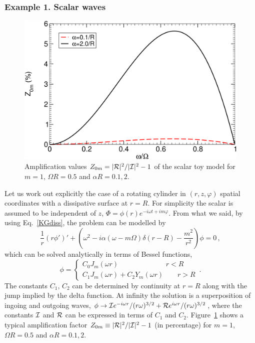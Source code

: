 \documentclass[11pt]{article}
\newcommand{\be}{\begin{equation}}
\newcommand{\ee}{\end{equation}}
\numberwithin{equation}{section} %
\begin{document}
\subsubsection{Example 1. Scalar waves}
%
\begin{figure}
\centerline{\includegraphics[height=7 cm]{scalar_toy.pdf}}
\caption{Amplification values $Z_{0m}=|{\cal R}|^2/|{\cal I}|^2-1$ of the scalar toy model for $m=1$, $\Omega R=0.5$ and $\alpha R=0.1,2$. } \label{Fig:scalar_toy}
\end{figure}
%
Let us work out explicitly the case of a rotating cylinder in $(r,z,\varphi)$ spatial coordinates with a dissipative surface at $r=R$. For simplicity
the scalar is assumed to be independent of $z$, $\Phi=\phi(r)e^{-i\omega t+im\varphi }$. From what we said, by using Eq.~\eqref{KGdiss}, the problem can be modelled by
%
\be
\frac{1}{r}\left(r\phi'\right)'+\left(\omega^2-i\alpha (\omega-m\Omega) \delta(r-R)-\frac{m^2}{r^2}\right)\phi=0\,,
\ee
%
which can be solved analytically in terms of Bessel functions,
%
\be
\phi=\left\{\begin{array}{l}
             C_0J_m(\omega r)  \qquad \hspace{2cm} r<R \\
             C_1J_m(\omega r)+C_2Y_m(\omega r) \qquad r>R
            \end{array}\right.
\,.
\ee
%
The constants $C_1,\,C_2$ can be determined by continuity at $r=R$ along with the jump implied by the delta function. At infinity the solution is a superposition of ingoing and outgoing waves, $\phi\to {\cal I} e^{-i\omega r}/(r\omega)^{3/2}+{\cal R} e^{i\omega r}/(r\omega)^{3/2}$, where the constants ${\cal I}$ and ${\cal R}$ can be expressed in terms of $C_1$ and $C_2$. 
Figure~\ref{Fig:scalar_toy} shows a typical amplification factor $Z_{0m}\equiv |{\cal R}|^2/|{\cal I}|^2-1$ (in percentage) for $m=1$, $\Omega R=0.5$ and $\alpha R=0.1,2$.
\end{document}
